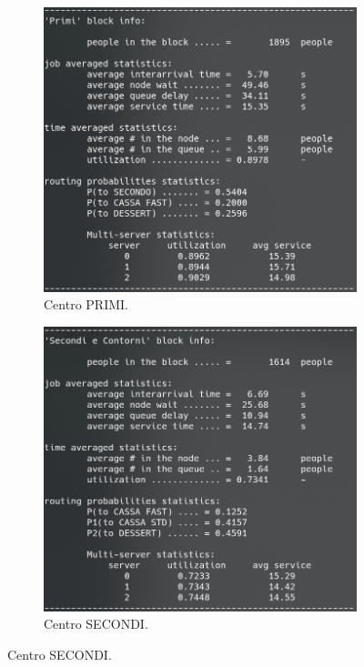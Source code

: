 \documentclass{article}
\begin{document}
\begin{figure}[H]
\begin{subfigure}{.5\textwidth}
  \centering
  \includegraphics[width=.9\linewidth]{img/migliorativo_2_2/primo.png}
  \caption{Centro PRIMI.}
  \label{fig:primo_ext_2_pol_2}
\end{subfigure}
\begin{subfigure}{.5\textwidth}
  \centering
  \includegraphics[width=.94\linewidth]{img/migliorativo_2_2/secondo.png}
  \caption{Centro SECONDI.}
  \label{fig:secondo_ext_2_pol_2}

\end{subfigure}
\end{figure}
\end{document}
